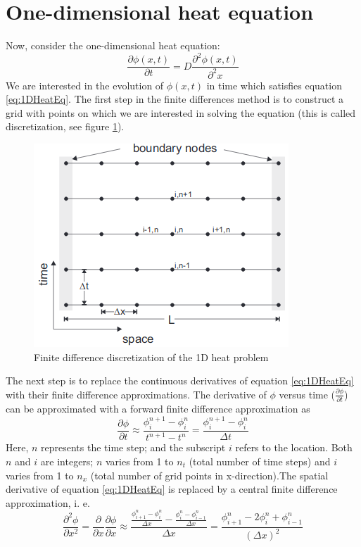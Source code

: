 \section{One-dimensional heat equation}
Now, consider the one-dimensional heat equation:
\begin{equation}
\label{eq:1DHeatEq}
\frac{\partial \phi (x,t)}{\partial t} = D \frac{\partial^2 \phi (x,t)}{\partial^2 x}
\end{equation}
We are interested in the evolution of $\phi(x,t)$  in  time which satisfies equation \ref{eq:1DHeatEq}. The  first step in the finite differences method is to construct a grid with points on which we are interested in solving the equation (this is called discretization, see figure \ref{fig:1d-grid}).

\begin{figure}[ht]\centering
\includegraphics[width=0.5\linewidth]{1d-grid}
\caption{Finite difference discretization of the 1D heat problem}
\label{fig:1d-grid}
\end{figure}

The next step is to replace the continuous derivatives of equation \ref{eq:1DHeatEq} with their finite difference approximations. The derivative of $\phi$ versus time ($\frac{\partial \phi}{\partial t}$) can be approximated with a forward finite difference approximation as
\begin{equation}
\frac{\partial \phi}{\partial t} \approx \frac{\phi^{n+1}_{i}-\phi^{n}_{i}}{t^{n+1}-t^{n}} =\frac{\phi^{n+1}_{i}-\phi^{n}_{i}}{\Delta t}
\label{eq:timeDiscret}
\end{equation}
Here, $n$ represents the time step; and the subscript $i$ refers to the location. Both $n$ and $i$ are integers; $n$ varies from 1 to $n_t$ (total number of time steps) and $i$ varies from 1 to $n_x$ (total number of grid points in x-direction).The spatial derivative of equation \ref{eq:1DHeatEq} is replaced by a central finite difference approximation, i. e. 
\begin{equation}
\frac{\partial^2 \phi}{\partial x^2} = \frac{\partial}{\partial x}\frac{\partial \phi}{\partial x} \approx \frac{\frac{\phi^n_{i+1}-\phi^n_{i}}{\Delta x}-\frac{\phi^n_{i}-\phi^n_{i-1}}{\Delta x}}{\Delta x} = \frac{\phi^n_{i+1}-2\phi^n_{i}+\phi^n_{i-1}}{(\Delta x)^2}
\label{eq:spatialDiscret}
\end{equation}

